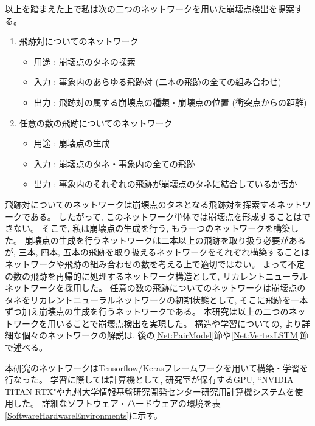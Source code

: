 以上を踏まえた上で私は次の二つのネットワークを用いた崩壊点検出を提案する。

\begin{enumerate}
 \item 飛跡対についてのネットワーク
 \begin{itemize}
  \item 用途 : 崩壊点のタネの探索
  \item 入力 : 事象内のあらゆる飛跡対 (二本の飛跡の全ての組み合わせ)
  \item 出力 : 飛跡対の属する崩壊点の種類・崩壊点の位置 (衝突点からの距離)
 \end{itemize}
 \item 任意の数の飛跡についてのネットワーク
 \begin{itemize}
  \item 用途 : 崩壊点の生成
  \item 入力 : 崩壊点のタネ・事象内の全ての飛跡
  \item 出力 : 事象内のそれぞれの飛跡が崩壊点のタネに結合しているか否か
 \end{itemize}
\end{enumerate}

飛跡対についてのネットワークは崩壊点のタネとなる飛跡対を探索するネットワークである。
したがって, このネットワーク単体では崩壊点を形成することはできない。
そこで, 私は崩壊点の生成を行う, もう一つのネットワークを構築した。
崩壊点の生成を行うネットワークは二本以上の飛跡を取り扱う必要があるが, 三本, 四本, 五本の飛跡を取り扱えるネットワークをそれぞれ構築することはネットワークや飛跡の組み合わせの数を考える上で適切ではない。
よって不定の数の飛跡を再帰的に処理するネットワーク構造として, リカレントニューラルネットワークを採用した。
任意の数の飛跡についてのネットワークは崩壊点のタネをリカレントニューラルネットワークの初期状態として, そこに飛跡を一本ずつ加え崩壊点の生成を行うネットワークである。
本研究は以上の二つのネットワークを用いることで崩壊点検出を実現した。
構造や学習についての, より詳細な個々のネットワークの解説は, 後の\ref{Net:PairModel}節や\ref{Net:VertexLSTM}節で述べる。

本研究のネットワークはTensorflow/Kerasフレームワークを用いて構築・学習を行なった。
学習に際しては計算機として, 研究室が保有するGPU, ``NVIDIA TITAN RTX"や九州大学情報基盤研究開発センター研究用計算機システムを使用した。
詳細なソフトウェア・ハードウェアの環境を表\ref{SoftwareHardwareEnvironments}に示す。


